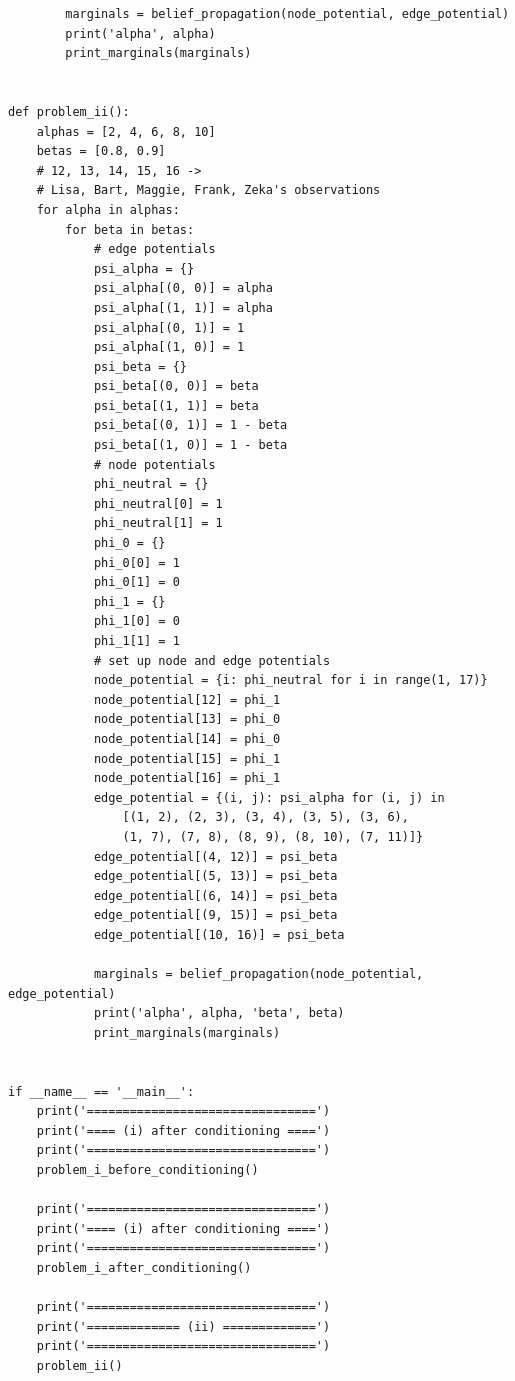 \documentclass{article}
\begin{document}
\begin{lstlisting}
        marginals = belief_propagation(node_potential, edge_potential)
        print('alpha', alpha)
        print_marginals(marginals)


def problem_ii():
    alphas = [2, 4, 6, 8, 10]
    betas = [0.8, 0.9]
    # 12, 13, 14, 15, 16 ->
    # Lisa, Bart, Maggie, Frank, Zeka's observations
    for alpha in alphas:
        for beta in betas:
            # edge potentials
            psi_alpha = {}
            psi_alpha[(0, 0)] = alpha
            psi_alpha[(1, 1)] = alpha
            psi_alpha[(0, 1)] = 1
            psi_alpha[(1, 0)] = 1
            psi_beta = {}
            psi_beta[(0, 0)] = beta
            psi_beta[(1, 1)] = beta
            psi_beta[(0, 1)] = 1 - beta
            psi_beta[(1, 0)] = 1 - beta
            # node potentials
            phi_neutral = {}
            phi_neutral[0] = 1
            phi_neutral[1] = 1
            phi_0 = {}
            phi_0[0] = 1
            phi_0[1] = 0
            phi_1 = {}
            phi_1[0] = 0
            phi_1[1] = 1
            # set up node and edge potentials
            node_potential = {i: phi_neutral for i in range(1, 17)}
            node_potential[12] = phi_1
            node_potential[13] = phi_0
            node_potential[14] = phi_0
            node_potential[15] = phi_1
            node_potential[16] = phi_1
            edge_potential = {(i, j): psi_alpha for (i, j) in
                [(1, 2), (2, 3), (3, 4), (3, 5), (3, 6),
                (1, 7), (7, 8), (8, 9), (8, 10), (7, 11)]}
            edge_potential[(4, 12)] = psi_beta
            edge_potential[(5, 13)] = psi_beta
            edge_potential[(6, 14)] = psi_beta
            edge_potential[(9, 15)] = psi_beta
            edge_potential[(10, 16)] = psi_beta

            marginals = belief_propagation(node_potential, edge_potential)
            print('alpha', alpha, 'beta', beta)
            print_marginals(marginals)


if __name__ == '__main__':
    print('================================')
    print('==== (i) after conditioning ====')
    print('================================')
    problem_i_before_conditioning()

    print('================================')
    print('==== (i) after conditioning ====')
    print('================================')
    problem_i_after_conditioning()

    print('================================')
    print('============= (ii) =============')
    print('================================')
    problem_ii()

\end{lstlisting}
\end{document}
